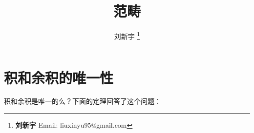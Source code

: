 \documentclass[UTF8]{article}
\begin{document}
\title{范畴}

\author{刘新宇
\thanks{{\bfseries 刘新宇} \newline
  Email: liuxinyu95@gmail.com \newline}
  }

\maketitle
\fi


\section{积和余积的唯一性}

积和余积是唯一的么？下面的定理回答了这个问题：
\end{document}
